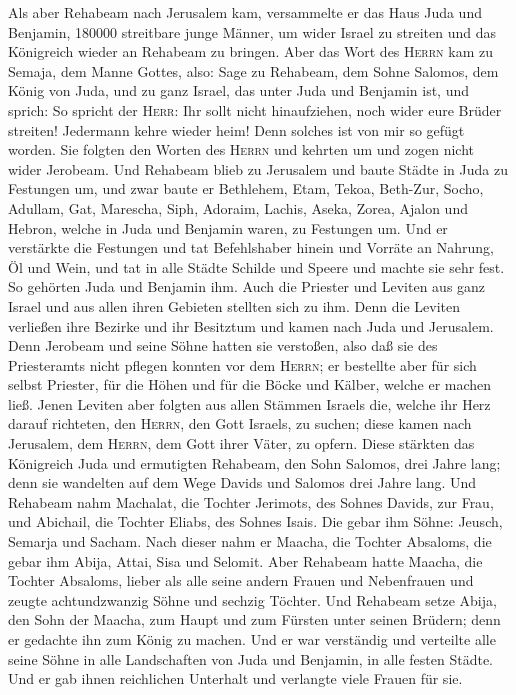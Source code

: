  Als aber Rehabeam nach Jerusalem kam, versammelte er das
Haus Juda und Benjamin, 180000 streitbare junge Männer, um wider Israel
zu streiten und das Königreich wieder an Rehabeam zu bringen.
 Aber das Wort des \textsc{Herrn} kam zu Semaja, dem Manne
Gottes, also:  Sage zu Rehabeam, dem Sohne Salomos, dem
König von Juda, und zu ganz Israel, das unter Juda und Benjamin ist, und
sprich:  So spricht der \textsc{Herr}: Ihr sollt nicht
hinaufziehen, noch wider eure Brüder streiten! Jedermann kehre wieder
heim! Denn solches ist von mir so gefügt worden. Sie folgten den Worten
des \textsc{Herrn} und kehrten um und zogen nicht wider Jerobeam.
 Und Rehabeam blieb zu Jerusalem und baute Städte in Juda
zu Festungen um,  und zwar baute er Bethlehem, Etam,
Tekoa,  Beth-Zur, Socho, Adullam,  Gat,
Marescha, Siph,  Adoraim, Lachis, Aseka, 
Zorea, Ajalon und Hebron, welche in Juda und Benjamin waren, zu
Festungen um.  Und er verstärkte die Festungen und tat
Befehlshaber hinein und Vorräte an Nahrung, Öl und Wein, 
und tat in alle Städte Schilde und Speere und machte sie sehr fest. So
gehörten Juda und Benjamin ihm.  Auch die Priester und
Leviten aus ganz Israel und aus allen ihren Gebieten stellten sich zu
ihm.  Denn die Leviten verließen ihre Bezirke und ihr
Besitztum und kamen nach Juda und Jerusalem. Denn Jerobeam und seine
Söhne hatten sie verstoßen, also daß sie des Priesteramts nicht pflegen
konnten vor dem \textsc{Herrn};  er bestellte aber für
sich selbst Priester, für die Höhen und für die Böcke und Kälber, welche
er machen ließ.  Jenen Leviten aber folgten aus allen
Stämmen Israels die, welche ihr Herz darauf richteten, den
\textsc{Herrn}, den Gott Israels, zu suchen; diese kamen nach Jerusalem,
dem \textsc{Herrn}, dem Gott ihrer Väter, zu opfern. 
Diese stärkten das Königreich Juda und ermutigten Rehabeam, den Sohn
Salomos, drei Jahre lang; denn sie wandelten auf dem Wege Davids und
Salomos drei Jahre lang.  Und Rehabeam nahm Machalat, die
Tochter Jerimots, des Sohnes Davids, zur Frau, und Abichail, die Tochter
Eliabs, des Sohnes Isais.  Die gebar ihm Söhne: Jeusch,
Semarja und Sacham.  Nach dieser nahm er Maacha, die
Tochter Absaloms, die gebar ihm Abija, Attai, Sisa und Selomit.
 Aber Rehabeam hatte Maacha, die Tochter Absaloms, lieber
als alle seine andern Frauen und Nebenfrauen und zeugte achtundzwanzig
Söhne und sechzig Töchter.  Und Rehabeam setze Abija, den
Sohn der Maacha, zum Haupt und zum Fürsten unter seinen Brüdern; denn er
gedachte ihn zum König zu machen.  Und er war verständig
und verteilte alle seine Söhne in alle Landschaften von Juda und
Benjamin, in alle festen Städte. Und er gab ihnen reichlichen Unterhalt
und verlangte viele Frauen für sie.

